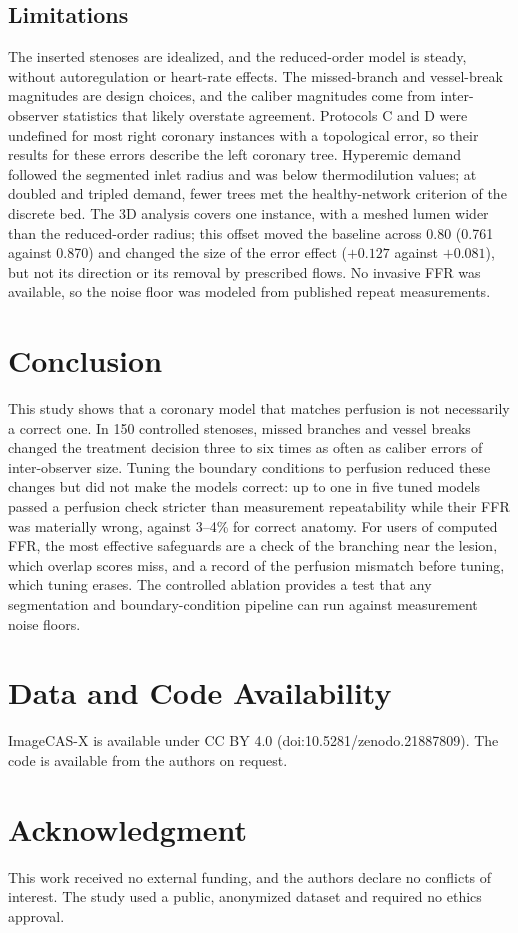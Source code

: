 \documentclass[journal]{IEEEtran}
\begin{document}
\subsection{Limitations}
The inserted stenoses are idealized, and the reduced-order model is steady, without autoregulation or heart-rate
effects. The missed-branch and vessel-break magnitudes are design choices, and the caliber magnitudes come from
inter-observer statistics that likely overstate agreement. Protocols C and D were undefined for most right coronary
instances with a topological error, so their results for these errors describe the left coronary tree. Hyperemic
demand followed the segmented inlet radius and was below thermodilution values; at doubled and tripled demand,
fewer trees met the healthy-network criterion of the discrete bed. The 3D analysis covers one instance, with a
meshed lumen wider than the reduced-order radius; this offset moved the baseline
across 0.80 (0.761 against 0.870) and changed the size of the error effect ($+0.127$ against $+0.081$), but not its
direction or its removal by prescribed flows. No invasive FFR was available, so the noise floor was modeled from published repeat
measurements.

\section{Conclusion}
This study shows that a coronary model that matches perfusion is not necessarily a correct one. In 150 controlled
stenoses, missed branches and vessel breaks changed the treatment decision three to six times as often as caliber
errors of inter-observer size. Tuning the boundary conditions to perfusion reduced these changes but did not make the
models correct: up to one in five tuned models passed a perfusion check stricter than measurement repeatability while
their FFR was materially wrong, against 3--4\% for correct anatomy. For users of computed FFR, the most effective
safeguards are a check of the branching near the lesion, which overlap scores miss, and a record of the perfusion
mismatch before tuning, which tuning erases. The controlled ablation provides a test that any segmentation and
boundary-condition pipeline can run against measurement noise floors.

\section*{Data and Code Availability}
ImageCAS-X is available under CC BY 4.0 (doi:10.5281/zenodo.21887809). The code is available from the authors on request.

\section*{Acknowledgment}
This work received no external funding, and the authors declare no conflicts of interest. The study used a public, anonymized dataset and required no ethics
approval.



\end{document}
